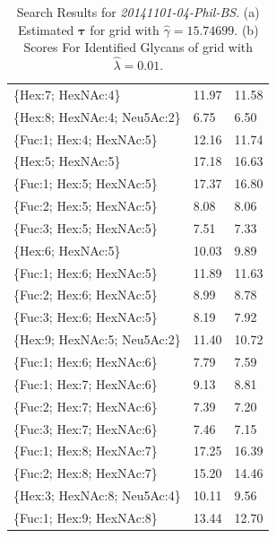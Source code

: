 \begin{table}
\begin{minipage}[t]{0.55\linewidth}
\begin{footnotesize}
\begin{tabular}{l|p{2cm} p{2cm}}
\{Hex:7; HexNAc:4\}                  &                11.97 &              11.58 \\
\{Hex:8; HexNAc:4; Neu5Ac:2\}        &                 6.75 &               6.50 \\
\{Fuc:1; Hex:4; HexNAc:5\}           &                12.16 &              11.74 \\
\{Hex:5; HexNAc:5\}                  &                17.18 &              16.63 \\
\{Fuc:1; Hex:5; HexNAc:5\}           &                17.37 &              16.80 \\
\{Fuc:2; Hex:5; HexNAc:5\}           &                 8.08 &               8.06 \\
\{Fuc:3; Hex:5; HexNAc:5\}           &                 7.51 &               7.33 \\
\{Hex:6; HexNAc:5\}                  &                10.03 &               9.89 \\
\{Fuc:1; Hex:6; HexNAc:5\}           &                11.89 &              11.63 \\
\{Fuc:2; Hex:6; HexNAc:5\}           &                 8.99 &               8.78 \\
\{Fuc:3; Hex:6; HexNAc:5\}           &                 8.19 &               7.92 \\
\{Hex:9; HexNAc:5; Neu5Ac:2\}        &                11.40 &              10.72 \\
\{Fuc:1; Hex:6; HexNAc:6\}           &                 7.79 &               7.59 \\
\{Fuc:1; Hex:7; HexNAc:6\}           &                 9.13 &               8.81 \\
\{Fuc:2; Hex:7; HexNAc:6\}           &                 7.39 &               7.20 \\
\{Fuc:3; Hex:7; HexNAc:6\}           &                 7.46 &               7.15 \\
\{Fuc:1; Hex:8; HexNAc:7\}           &                17.25 &              16.39 \\
\{Fuc:2; Hex:8; HexNAc:7\}           &                15.20 &              14.46 \\
\{Hex:3; HexNAc:8; Neu5Ac:4\}        &                10.11 &               9.56 \\
\{Fuc:1; Hex:9; HexNAc:8\}           &                13.44 &              12.70 \\
\end{tabular}

    \end{footnotesize}
    
        \end{minipage}
        \caption{
                 Search Results for \textit{20141101-04-Phil-BS}.
                 (a) Estimated $\mathbf{\tau}$ for grid with ${\hat \gamma} = 15.74699$.
                 (b) Scores For Identified Glycans of grid with ${\hat \lambda} = 0.01$.}
        \label{tbl:phil_bs_score_table}
    \end{table}
